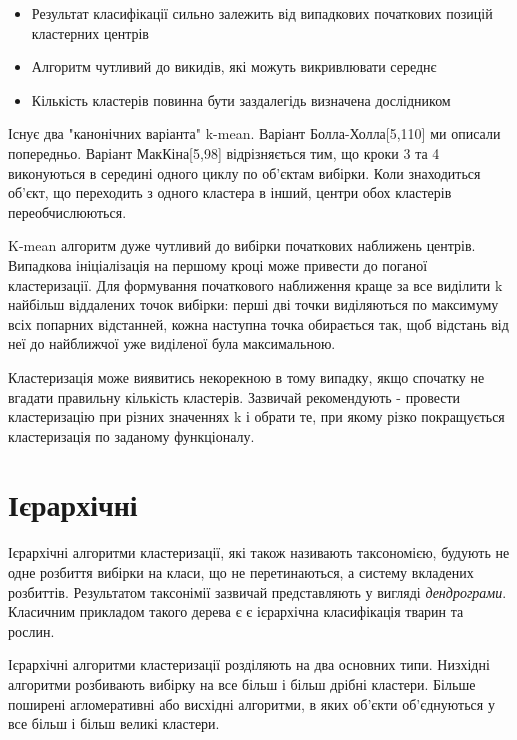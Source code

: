 \documentclass[a4paper,14pt,russian]{extreport}
\begin{document}
\begin{itemize}

  \item  Результат класифікації сильно залежить від випадкових початкових позицій кластерних центрів
\item    Алгоритм чутливий до викидів, які можуть викривлювати середнє
\item     Кількість кластерів повинна бути заздалегідь визначена дослідником

\end{itemize}	
\par 
Існує два "канонічних варіанта"  k-mean. Варіант Болла-Холла[5,110] ми описали попередньо. Варіант МакКіна[5,98] відрізняється тим, що кроки 3 та 4 виконуються в середині одного циклу по об'єктам вибірки. Коли знаходиться об'єкт, що переходить з одного кластера в інший, центри обох кластерів переобчислюються.\par 
K-mean алгоритм дуже чутливий до вибірки початкових наближень центрів. Випадкова ініціалізація на першому кроці може привести до поганої кластеризації. Для формування початкового наближення краще за все виділити  k найбільш віддалених точок вибірки: перші дві точки виділяються по максимуму всіх попарних відстанней, кожна наступна точка обирається так, щоб відстань від неї до найближчої уже виділеної була максимальною. \par 
Кластеризація може виявитись некорекною в тому випадку, якщо спочатку не вгадати правильну кількість кластерів. Зазвичай рекомендують  - провести кластеризацію при різних значеннях k і обрати те, при якому різко покращується кластеризація по заданому функціоналу.
	
	\section{Ієрархічні}
	Ієрархічні алгоритми кластеризації, які також називають таксономією, будують не одне розбиття вибірки на класи, що не перетинаються, а систему вкладених розбиттів. Результатом таксонімії зазвичай представляють у вигляді \textit{дендрограми}. Класичним прикладом такого дерева є є ієрархічна класифікація тварин та рослин. \par
Ієрархічні алгоритми кластеризації розділяють на два основних типи. 
Низхідні алгоритми розбивають вибірку на все більш і більш
дрібні кластери. Більше поширені
агломеративні
або висхідні алгоритми, в яких об'єкти об'єднуються у все більш і більш великі кластери.
\end{document}
